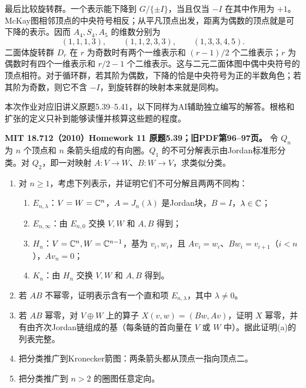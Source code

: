 \begin{solution}
最后比较旋转群。一个表示能下降到 $G/\{\pm I\}$，当且仅当 $-I$ 在其中作用为 $+1$。McKay图相邻顶点的中央符号相反；从平凡顶点出发，距离为偶数的顶点就是可下降的表示。因而 $A_4,S_4,A_5$ 的维数分别为
\[
 (1,1,1,3),\qquad (1,1,2,3,3),\qquad(1,3,3,4,5).
\]
二面体旋转群 $D_r$ 在 $r$ 为奇数时有两个一维表示和 $(r-1)/2$ 个二维表示；$r$ 为偶数时有四个一维表示和 $r/2-1$ 个二维表示。这与二元二面体图中偶中央符号的顶点相符。对于循环群，若其阶为偶数，下降的恰是中央符号为正的半数角色；若其阶为奇数，则它不含 $-I$，到旋转群的映射本来就是同构。
\end{solution}

本次作业对应旧讲义原题5.39--5.41，以下同样为AI辅助独立编写的解答。根格和扩张的定义只补到能够读懂并核算这些题的程度。

\begin{exercise}\label{hw:5.39}
\textbf{MIT 18.712（2010）Homework 11 原题5.39；旧PDF第96--97页。}
令 $Q_n$ 为 $n$ 个顶点和 $n$ 条箭头组成的有向圈。$Q_1$ 的不可分解表示由Jordan标准形分类。对 $Q_2$，即一对映射 $A:V\to W$、$B:W\to V$，求类似分类。
\begin{enumerate}[label=(\alph*)]
\item 对 $n\ge1$，考虑下列表示，并证明它们不可分解且两两不同构：
\begin{enumerate}[label=\arabic*)]
\item $E_{n,\lambda}$：$V=W=\mathbb C^n$，$A=J_n(\lambda)$ 是Jordan块，$B=I$，$\lambda\in\mathbb C$；
\item $E_{n,\infty}$：由 $E_{n,0}$ 交换 $V,W$ 和 $A,B$ 得到；
\item $H_n$：$V=\mathbb C^n,W=\mathbb C^{n-1}$，基为 $v_i,w_i$，且 $Av_i=w_i$、$Bw_i=v_{i+1}$（$i<n$），$Av_n=0$；
\item $K_n$：由 $H_n$ 交换 $V,W$ 和 $A,B$ 得到。
\end{enumerate}
\item 若 $AB$ 不幂零，证明表示含有一个直和项 $E_{n,\lambda}$，其中 $\lambda\ne0$。
\item 若 $AB$ 幂零，对 $V\oplus W$ 上的算子 $X(v,w)=(Bw,Av)$，证明 $X$ 幂零，并有由齐次Jordan链组成的基（每条链的首向量在 $V$ 或 $W$ 中）。据此证明(a)的列表完整。
\item 把分类推广到Kronecker箭图：两条箭头都从顶点一指向顶点二。
\item 把分类推广到 $n>2$ 的圈图任意定向。
\end{enumerate}
\end{exercise}
